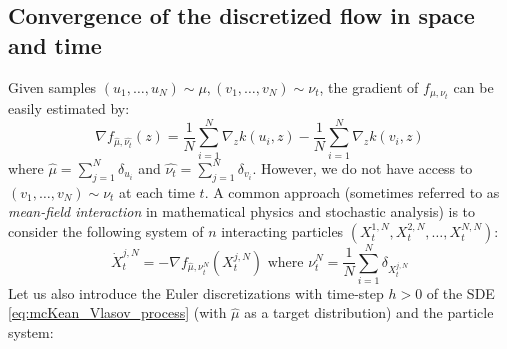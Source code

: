 \subsection{Convergence of the discretized flow in space and time}

Given samples $(u_1, \dots, u_N)\sim \mu, (v_1, \dots, v_N)\sim \nu_t$, the gradient of $f_{\mu, \nu_t}$ can be easily estimated by:
\begin{equation}
\nabla f_{\widehat{\mu},\widehat{\nu_t}}(z)= \frac{1}{N}\sum_{i=1}^{N}\nabla_{z}k(u_i,z) -\frac{1}{N}\sum_{i=1}^{N}\nabla_{z}k(v_i,z) 
\end{equation}
where $\widehat{ \mu}=\sum_{j=1}^{N}\delta_{u_i}$ and $\widehat{ \nu_t}=\sum_{j=1}^{N}\delta_{v_i}$. However, we do not have access to $(v_1, \dots, v_N)\sim \nu_t$ at each time $t$. A common approach (sometimes referred to as \textit{mean-field interaction} in mathematical physics and stochastic analysis) is to consider the following system of $n$ interacting particles $(X_t^{1,N}, X_t^{2,N}, \dots, X_t^{N,N})$: 
\begin{equation}\label{eq:sample_based_process}
\dot{X}_t^{j,N}=-\nabla f_{\widehat{\mu}, \nu_t^N}(X_t^{j,N}) \text{ where } \nu_t^N=\frac{1}{N} \sum_{i=1}^N \delta_{X_t^{j,N}}
\end{equation}
Let us also introduce the Euler discretizations with time-step $h > 0$ of the SDE \eqref{eq:mcKean_Vlasov_process} (with $\widehat{ \mu}$ as a target distribution) and the particle system:
